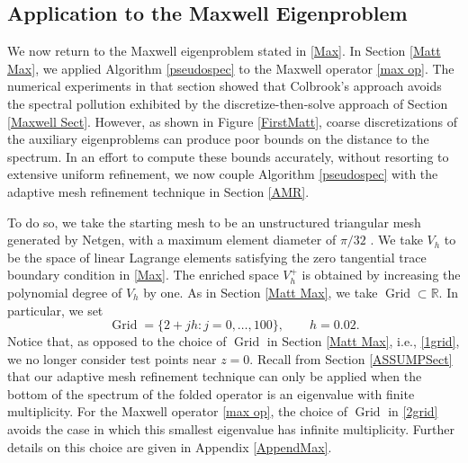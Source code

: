 
\subsection{Application to the Maxwell Eigenproblem}\label{DWRMatt}

We now return to the Maxwell eigenproblem stated in \eqref{Max}. In Section \ref{Matt Max}, we applied Algorithm \ref{pseudospec} to the Maxwell operator \eqref{max op}. The numerical experiments in that section 
showed that Colbrook's approach avoids the spectral pollution exhibited by the discretize-then-solve approach of Section \ref{Maxwell Sect}. However, as shown in Figure \ref{FirstMatt}, coarse discretizations of the auxiliary eigenproblems can produce poor bounds on the distance to the spectrum. In an effort to compute these bounds accurately, without resorting to extensive uniform refinement, we now couple Algorithm \ref{pseudospec} with the adaptive mesh refinement technique in Section \ref{AMR}.

To do so, we take the starting mesh to be an unstructured triangular mesh generated by Netgen, with a maximum element diameter of $\pi/32$ \cite{Schoberl1997}. We take $V_h$ to be the space of linear Lagrange elements satisfying the zero tangential trace boundary condition in \eqref{Max}. The enriched space $V_h^+$ is obtained by increasing the polynomial degree of $V_h$ by one. As in Section \ref{Matt Max}, we take $\operatorname{Grid} \subset \mathbb{R}.$ In particular, we set
\begin{equation} \label{2grid}
    \operatorname{Grid} = \{2 + jh : j = 0, \dots, 100\}, \qquad h = 0.02.
\end{equation}
Notice that, as opposed to the choice of $\operatorname{Grid}$ in Section \ref{Matt Max}, i.e., \eqref{1grid}, we no longer consider test points near $z=0.$ Recall from Section \ref{ASSUMPSect} that our adaptive mesh refinement technique can only be applied when the bottom of the spectrum of the folded operator is an eigenvalue with finite multiplicity. For the Maxwell operator \eqref{max op}, the choice of $\operatorname{Grid}$ in \eqref{2grid} avoids the case in which this smallest eigenvalue has infinite multiplicity. Further details on this choice are given in Appendix \ref{AppendMax}.


